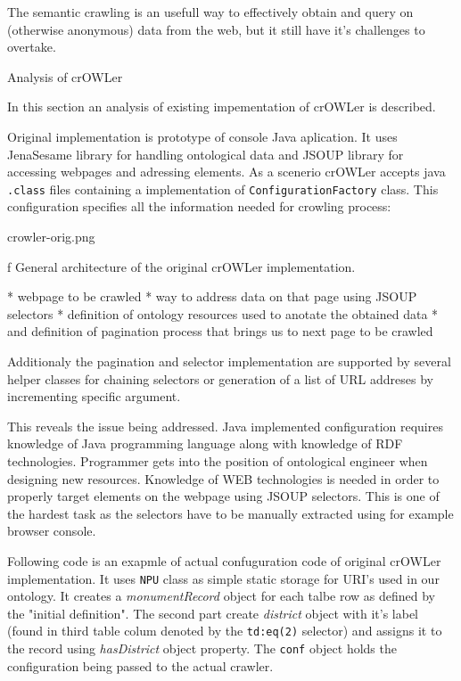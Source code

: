 The semantic crawling is an usefull way to effectively obtain and query on
(otherwise anonymous) data from the web, but it still have it's challenges to
overtake. 


\sec Analysis of crOWLer

In this section an analysis of existing impementation of crOWLer is described. 

Original implementation is prototype of console Java aplication. It uses
JenaSesame library for handling ontological data and JSOUP library for
accessing webpages and adressing elements. As a scenerio crOWLer accepts java
{\tt .class} files containing a implementation of {\tt ConfigurationFactory}
class. This configuration specifies all the information needed for crowling
process: 

\midinsert
\picw=10cm \cinspic crowler-orig.png
\caption/f General architecture of the original crOWLer implementation. 
\endinsert

\begitems
  * webpage to be crawled
  * way to address data on that page using JSOUP selectors
  * definition of ontology resources used to anotate the obtained data
  * and definition of pagination process that brings us to next page to be crawled
\enditems

Additionaly the pagination and selector implementation are supported by several
helper classes for chaining selectors or generation of a list of URL addreses
by incrementing specific argument. 

This reveals the issue being addressed. Java implemented configuration requires
knowledge of Java programming language along with knowledge of RDF
technologies. Programmer gets into the position of ontological engineer when
designing new resources. Knowledge of WEB technologies is needed in order to
properly target elements on the webpage using JSOUP selectors. This is one of
the hardest task as the selectors have to be manually extracted using for
example browser console. 

Following code is an exapmle of actual confuguration code of original crOWLer
implementation.  It uses {\tt NPU} class as simple static storage for URI's
used in our ontology. It creates a {\em monumentRecord} object for each talbe
row as defined by the "initial definition". The second part create {\em
district} object with it's label (found in third table colum denoted by the
{\tt td:eq(2)} selector) and assigns it to the record using {\em hasDistrict}
object property. The {\tt conf} object holds the configuration being passed to
the actual crawler. 

